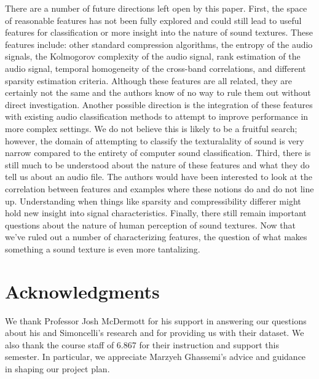 \documentclass{sig-alternate-05-2015}
\begin{document}
There are a number of future directions left open by this paper. First, the space of reasonable features has not been fully explored and could still lead to useful features for classification or more insight into the nature of sound textures. These features include: other standard compression algorithms, the entropy of the audio signals, the Kolmogorov complexity of the audio signal, rank estimation of the audio signal, temporal homogeneity of the cross-band correlations, and different sparsity estimation criteria. Although these features are all related, they are certainly not the same and the authors know of no way to rule them out without direct investigation. Another possible direction is the integration of these features with existing audio classification methods to attempt to improve performance in more complex settings. We do not believe this is likely to be a fruitful search; however, the domain of attempting to classify the texturalality of sound is very narrow compared to the entirety of computer sound classification. Third, there is still much to be understood about the nature of these features and what they do tell us about an audio file. The authors would have been interested to look at the correlation between features and examples where these notions do and do not line up. Understanding when things like sparsity and compressibility differer might hold new insight into signal characteristics. Finally, there still remain important questions about the nature of human perception of sound textures. Now that we've ruled out a number of characterizing features, the question of what makes something a sound texture is even more tantalizing. 

\section*{Acknowledgments}

We thank Professor Josh McDermott for his support in answering our questions about his and Simoncelli's research and for providing us with their dataset. We also thank the course staff of 6.867 for their instruction and support this semester. In particular, we appreciate Marzyeh Ghassemi's advice and guidance in shaping our project plan.
\end{document}
